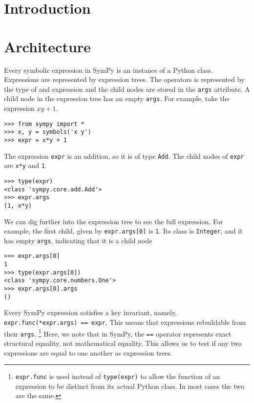 \documentclass{article}
\begin{document}
\section{Introduction}


\section{Architecture}


Every symbolic expression in SymPy is an instance of a Python class.
Expressions are represented by expression trees. The operators is represented
by the type of and expression and the child nodes are stored in the \texttt{args}
attribute. A child node in the expression tree has an empty \texttt{args}. For
example, take the expression $xy + 1$.

\begin{verbatim}
>>> from sympy import *
>>> x, y = symbols('x y')
>>> expr = x*y + 1
\end{verbatim}

The expression \texttt{expr} is an addition, so it is of type \texttt{Add}. The child
nodes of \texttt{expr} are \texttt{x*y} and \texttt{1}.

\begin{verbatim}
>>> type(expr)
<class 'sympy.core.add.Add'>
>>> expr.args
(1, x*y)
\end{verbatim}

We can dig further into the expression tree to see the full expression. For
example, the first child, given by \texttt{expr.args[0]} is \texttt{1}. Its class is
\texttt{Integer}, and it has empty \texttt{args}, indicating that it is a child node

\begin{verbatim}
>>> expr.args[0]
1
>>> type(expr.args[0])
<class 'sympy.core.numbers.One'>
>>> expr.args[0].args
()
\end{verbatim}

Every SymPy expression satisfies a key invariant, namely,
\texttt{expr.func(*expr.args) == expr}. This means that expressions rebuildable
from their \texttt{args}. \footnote{\texttt{expr.func} is used instead of
  \texttt{type(expr)} to allow the function of an expression to be distinct from
  its actual Python class. In most cases the two are the same.} Here, we note
that in SymPy, the \texttt{==} operator represents exact structural equality, not
mathematical equality. This allows us to test if any two expressions are equal
to one another as expression trees.
\end{document}
